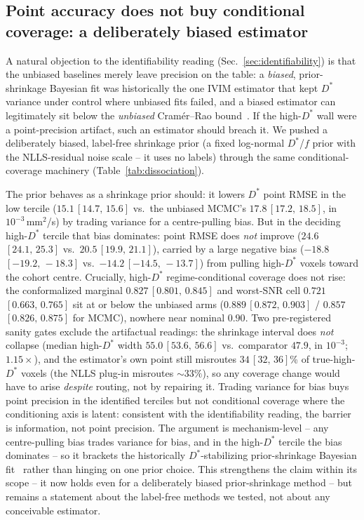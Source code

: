\documentclass[11pt]{article}
\newcommand{\Dstar}{D^{*}}
\newcommand{\band}[2]{{\scriptsize\,$[#1,\,#2]$}}
\begin{document}
\subsection{Point accuracy does not buy conditional coverage: a deliberately
biased estimator}
\label{sec:dissociation-shrinkage}
A natural objection to the identifiability reading (Sec.~\ref{sec:identifiability})
is that the unbiased baselines merely leave precision on the table: a \emph{biased},
prior-shrinkage Bayesian fit was historically the one IVIM estimator that kept
$\Dstar$ variance under control where unbiased fits failed, and a biased estimator
can legitimately sit below the \emph{unbiased} Cram\'er--Rao
bound~\citep{gurneychampion2018}. If the high-$\Dstar$ wall were a point-precision
artifact, such an estimator should breach it. We pushed a deliberately biased,
label-free shrinkage prior (a fixed log-normal $\Dstar$/$f$ prior with the
NLLS-residual noise scale -- it uses no labels) through the same
conditional-coverage machinery (Table~\ref{tab:dissociation}).

The prior behaves as a shrinkage prior should: it lowers $\Dstar$ point RMSE in the
low tercile ($15.1$\band{14.7}{15.6} vs.\ the unbiased MCMC's
$17.8$\band{17.2}{18.5}, in $10^{-3}$\,mm$^2$/s) by trading variance for a
centre-pulling bias. But in the deciding high-$\Dstar$ tercile that bias dominates:
point RMSE does \emph{not} improve ($24.6$\band{24.1}{25.3} vs.\
$20.5$\band{19.9}{21.1}), carried by a large negative bias
($-18.8$\band{-19.2}{-18.3} vs.\ $-14.2$\band{-14.5}{-13.7}) from pulling
high-$\Dstar$ voxels toward the cohort centre. Crucially, high-$\Dstar$
regime-conditional coverage does not rise: the conformalized marginal
$0.827$\band{0.801}{0.845} and worst-SNR cell $0.721$\band{0.663}{0.765} sit at or
below the unbiased arms ($0.889$\band{0.872}{0.903} / $0.857$\band{0.826}{0.875} for
MCMC), nowhere near nominal $0.90$. Two pre-registered sanity gates exclude the
artifactual readings: the shrinkage interval does \emph{not} collapse (median
high-$\Dstar$ width $55.0$\band{53.6}{56.6} vs.\ comparator $47.9$, in
$10^{-3}$; $1.15\times$), and the estimator's own point still misroutes
$34$\band{32}{36}\% of true-high-$\Dstar$ voxels (the NLLS plug-in misroutes
$\sim33\%$), so any coverage change would have to arise \emph{despite} routing, not
by repairing it. Trading variance for bias buys point precision in the identified
terciles but not conditional coverage where the conditioning axis is latent:
consistent with the identifiability reading, the barrier is information, not point
precision. The argument is mechanism-level -- any centre-pulling bias trades
variance for bias, and in the high-$\Dstar$ tercile the bias dominates -- so it
brackets the historically $\Dstar$-stabilizing prior-shrinkage Bayesian
fit~\citep{gurneychampion2018} rather than hinging on one prior choice. This
strengthens the claim within its scope -- it now holds even for a
deliberately biased prior-shrinkage method -- but remains a statement about the
label-free methods we tested, not about any conceivable estimator.
\end{document}
